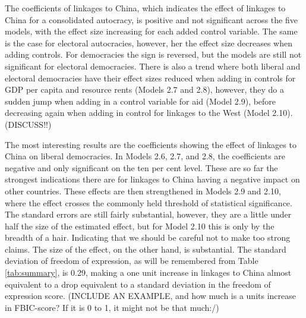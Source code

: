 The coefficients of linkages to China, which indicates the effect of linkages to China for a consolidated autocracy, is positive and not significant across the five models, with the effect size increasing for each added control variable. The same is the case for electoral autocracies, however, her the effect size decreases when adding controls. For democracies the sign is reversed, but the models are still not significant for electoral democracies. There is also a trend where both liberal and electoral democracies have their effect sizes reduced when adding in controls for GDP per capita and resource rents (Models 2.7 and 2.8), however, they do a sudden jump when adding in a control variable for aid (Model 2.9), before decreasing again when adding in control for linkages to the West (Model 2.10). (DISCUSS!!)

The most interesting results are the coefficients showing the effect of linkages to China on liberal democracies. In Models 2.6, 2.7, and 2.8, the coefficients are negative and only significant on the ten per cent level. These are so far the strongest indications there are for linkages to China having a negative impact on other countries. These effects are then strengthened in Models 2.9 and 2.10, where the effect crosses the commonly held threshold of statistical significance. The standard errors are still fairly substantial, however, they are a little under half the size of the estimated effect, but for Model 2.10 this is only by the breadth of a hair. Indicating that we should be careful not to make too strong claims. The size of the effect, on the other hand, is substantial. The standard deviation of freedom of expression, as will be remembered from Table \ref{tab:summary}, is 0.29, making a one unit increase in linkages to China almost equivalent to a drop equivalent to a standard deviation in the freedom of expression score. (INCLUDE AN EXAMPLE, and how much is a units increase in FBIC-score? If it is 0 to 1, it might not be that much:/)

